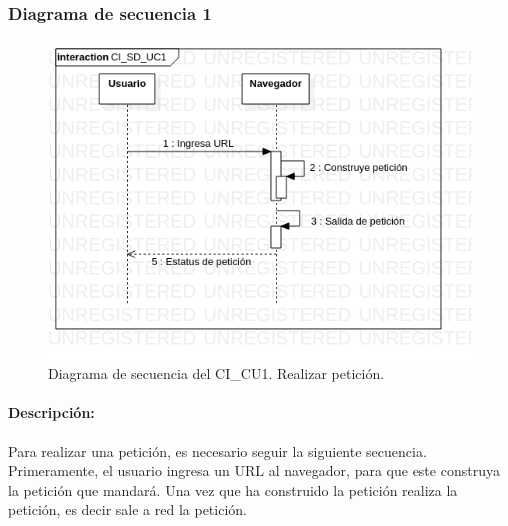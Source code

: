 \documentclass[12pt, a4paper, titlepage]{report}
\begin{document}
              	\subsubsection{Diagrama de secuencia 1}
                	\begin{figure}[H]
        			    \begin{center} \includegraphics[width=15cm]{./imagenes/Disenio/Componente_1/CI_SD_UC1.png}
        			    \caption[Diagrama de secuencia 1 del Componente I]{Diagrama de secuencia del CI\_CU1. Realizar petición.}
        		        \end{center}
        		    \end{figure}
        		    
        		    \paragraph{Descripción:}
        		    Para realizar una petición, es necesario seguir la siguiente secuencia. Primeramente, el usuario ingresa un URL al navegador, para que este construya la petición que mandará. Una vez que ha construido la petición realiza la petición, es decir sale a red la petición.
    		    
    		    
\end{document}
